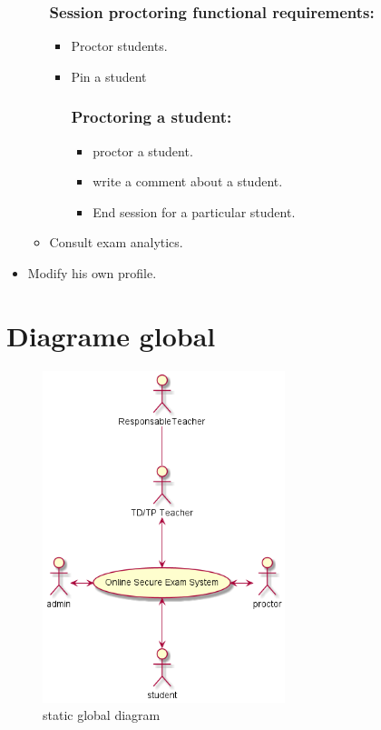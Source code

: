 \documentclass[a4paper,12p]{article}
\begin{document}
\begin{itemize}
\begin{itemize}
            \subsubsection{Session proctoring functional requirements:}
            \begin{itemize}
                \item Proctor students.
                \item Pin a student
                \subsubsection{Proctoring a student:}
                \begin{itemize}
                    \item proctor a student.
                    \item write a comment about a student.
                    \item End session for a particular student.
             \end{itemize}
         \end{itemize}
        \item Consult exam analytics.
     \end{itemize}
     \item Modify his own profile.
    \end{itemize}





     \section{Diagrame global }
     \vspace{5cm}
     \begin{figure}[h]
         \centering
         \includegraphics[width=200pt]{SCD}
         \caption{static global diagram}
     \end{figure}
     \clearpage
\end{document}

